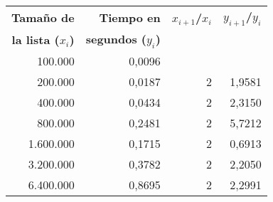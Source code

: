 \centering%
\begin{center}
\begin{tabular}{||r|r|r|r||}
\hline \hline
{\bf Tamaño de } & {\bf Tiempo en } & {\bf $x_{i+1}$/$x_i$} & {\bf $y_{i+1}$/$y_i$} \\
{\bf la lista ($x_i$)} & {\bf segundos ($y_i$)} &  &  \\
\hline \hline
   100.000 &     0,0096 &            &            \\
\hline
   200.000 &     0,0187 &          2 &     1,9581 \\
\hline
   400.000 &     0,0434 &          2 &     2,3150 \\
\hline
   800.000 &     0,2481 &          2 &     5,7212 \\
\hline
 1.600.000 &     0,1715 &          2 &     0,6913 \\
\hline
 3.200.000 &     0,3782 &          2 &     2,2050 \\
\hline
 6.400.000 &     0,8695 &          2 &     2,2991 \\
\hline
\hline
\end{tabular}
%
\end{center}
